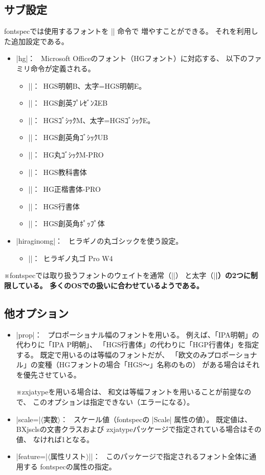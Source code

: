\documentclass[a4paper]{bxjsarticle}
\newcommand{\Pkg}[1]{\textsf{#1}}
\newcommand{\Meta}[1]{$\langle$\mbox{}#1\mbox{}$\rangle$}
\newcommand{\Note}{\par\noindent ※}
\newcommand{\Means}{：\ }
\begin{document}
\subsection{サブ設定}

\Pkg{fontspec}では使用するフォントを |\newfontfamily| 命令で
増やすことができる。
それを利用した追加設定である。

\begin{itemize}
\item |hg|\Means
Microsoft Officeのフォント（HGフォント）に対応する、
以下のファミリ命令が定義される。
\begin{itemize}
\item |\hgmcfamily|\Means HGS明朝B、太字=HGS明朝E。
\item |\hgprfamily|\Means HGS創英ﾌﾟﾚｾﾞﾝｽEB
\item |\hggtfamily|\Means HGSｺﾞｼｯｸM、太字=HGSｺﾞｼｯｸE。
\item |\hggufamily|\Means HGS創英角ｺﾞｼｯｸUB
\item |\hgmgfamily|\Means HG丸ｺﾞｼｯｸM-PRO
\item |\hgkkfamily|\Means HGS教科書体
\item |\hgksfamily|\Means HG正楷書体-PRO
\item |\hggsfamily|\Means HGS行書体
\item |\hgppfamily|\Means HGS創英角ﾎﾟｯﾌﾟ体
\end{itemize}
\item |hiraginomg|\Means
ヒラギノの丸ゴシックを使う設定。
\begin{itemize}
\item |\hmgfamily|\Means ヒラギノ丸ゴ Pro W4
\end{itemize}
\end{itemize}
\Note \Pkg{fontspec}では取り扱うフォントのウェイトを通常（|\mdseries|）
と太字（|\bfseries|）の2つに制限している。
多くのOSでの扱いに合わせているようである。

\subsection{他オプション}

\begin{itemize}
\item |prop|\Means
プロポーショナル幅のフォントを用いる。
例えば、「IPA明朝」の代わりに「IPA P明朝」、
「HGS行書体」の代わりに「HGP行書体」を指定する。
既定で用いるのは等幅のフォントだが、
「欧文のみプロポーショナル」の変種（HGフォントの場合「HGS～」名称のもの）
がある場合はそれを優先させている。
\Note \Pkg{zxjatype}を用いる場合は、
和文は等幅フォントを用いることが前提なので、
このオプションは指定できない（エラーになる）。

\item |scale=|\Meta{実数}\Means
スケール値（\Pkg{fontspec}の |Scale| 属性の値）。
既定値は、\Pkg{BXjscls}の文書クラスおよび
\Pkg{zxjatype}パッケージで指定されている場合はその値、
なければ1となる。

\item |feature={|\Meta{属性リスト}|}|\Means
このパッケージで指定されるフォント全体に通用する
\Pkg{fontspec}の属性の指定。

\end{itemize}
\end{document}
